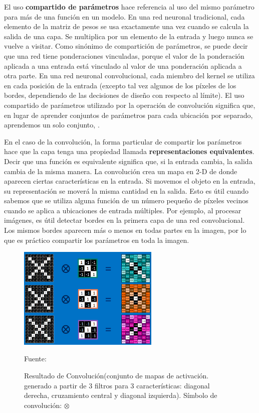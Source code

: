 		
		El uso {\bf compartido de parámetros} hace referencia al uso del mismo parámetro para más de una función en un modelo. En una red neuronal tradicional, cada elemento de la matriz de pesos se usa exactamente una vez cuando se calcula la salida de una capa. Se multiplica por un elemento de la entrada y luego nunca se vuelve a visitar. Como sinónimo de compartición de parámetros, se puede decir que una red tiene ponderaciones vinculadas, porque el valor de la ponderación aplicada a una entrada está vinculado al valor de una ponderación aplicada a otra parte. En una red neuronal convolucional, cada miembro del kernel se utiliza en cada posición de la entrada (excepto tal vez algunos de los píxeles de los bordes, dependiendo de las decisiones de diseño con respecto al límite). El uso compartido de parámetros utilizado por la operación de convolución significa que, en lugar de aprender conjuntos de parámetros para cada ubicación por separado, aprendemos un solo conjunto, \citep{Goodfellow-et-al-2016}.
		\vskip 0.4cm  

		En el caso de la convolución, la forma particular de compartir los parámetros hace que la capa tenga una propiedad llamada {\bf representaciones equivalentes}. Decir que una función es equivalente significa que, si la entrada cambia, la salida cambia de la misma manera.
		La convolución crea un mapa en 2-D de donde aparecen ciertas características en la entrada. Si movemos el objeto en la entrada, su representación se moverá la misma cantidad en la salida. Esto es útil cuando sabemos que se utiliza alguna función de un número pequeño de píxeles vecinos cuando se aplica a ubicaciones de entrada múltiples. Por ejemplo, al procesar imágenes, es útil detectar bordes en la primera capa de una red convolucional. Los mismos bordes aparecen más o menos en todas partes en la imagen, por lo que es práctico compartir los parámetros en toda la imagen.

		\begin{figure}[H]
		\begin{center}
		\includegraphics[width=0.6\textwidth]{images/marcoteorico/result_conv}
		\end{center}
		\begin{center}
		\vskip 0.1cm  
		\caption{\small{Resultado de Convolución(conjunto de mapas de activación. generado a partir de 3 filtros para 3 características: diagonal derecha, cruzamiento central y diagonal izquierda). Símbolo de convolución: $\otimes$}}
		\vskip -0.1cm  
		{\small{Fuente: \cite{Rohrer}}}
		\end{center}
		\vspace{-1.9em}
		\end{figure}

